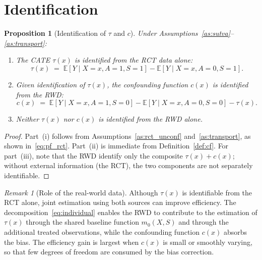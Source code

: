 \documentclass[10pt]{article}
\theoremstyle{plain}
\newtheorem{proposition}{Proposition}
\theoremstyle{definition}
\theoremstyle{remark}
\newtheorem{remark}{Remark}
\newcommand{\E}{\mathbb{E}}
\newcommand{\CATE}{\tau}
\newcommand{\cf}{c}
\begin{document}
\section{Identification}

\begin{proposition}[Identification of $\CATE$ and $\cf$]\label{prop:ident}
  Under Assumptions~\ref{as:sutva}--\ref{as:transport}:
  \begin{enumerate}
    \item[\emph{(i)}] The CATE $\CATE(x)$ is identified from the RCT data alone:
    \begin{equation}\label{eq:ident_tau}
      \CATE(x) \;=\; \E[Y \mid X{=}x, A{=}1, S{=}1] - \E[Y \mid X{=}x, A{=}0, S{=}1].
    \end{equation}
    \item[\emph{(ii)}] Given identification of $\CATE(x)$, the confounding function $\cf(x)$ is identified from the RWD:
    \begin{equation}\label{eq:ident_c}
      \cf(x) \;=\; \E[Y \mid X{=}x, A{=}1, S{=}0] - \E[Y \mid X{=}x, A{=}0, S{=}0] - \CATE(x).
    \end{equation}
    \item[\emph{(iii)}] Neither $\CATE(x)$ nor $\cf(x)$ is identified from the RWD alone.
  \end{enumerate}
\end{proposition}

\begin{proof}
  Part~(i) follows from Assumptions~\ref{as:rct_unconf} and~\ref{as:transport}, as shown in~\eqref{eq:pf_rct}. Part~(ii) is immediate from Definition~\ref{def:cf}. For part~(iii), note that the RWD identify only the composite $\CATE(x) + \cf(x)$; without external information (the RCT), the two components are not separately identifiable.
\end{proof}

\begin{remark}[Role of the real-world data]
  Although $\CATE(x)$ is identifiable from the RCT alone, joint estimation using both sources can improve efficiency. The decomposition~\eqref{eq:individual} enables the RWD to contribute to the estimation of $\CATE(x)$ through the shared baseline function $m_0(X,S)$ and through the additional treated observations, while the confounding function $\cf(x)$ absorbs the bias. The efficiency gain is largest when $\cf(x)$ is small or smoothly varying, so that few degrees of freedom are consumed by the bias correction.
\end{remark}
\end{document}
